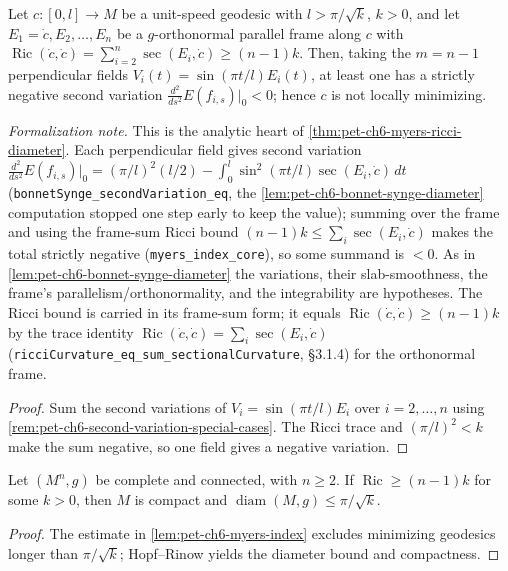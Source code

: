 \begin{lemma}
  \label{lem:pet-ch6-myers-index}


  Let $c:[0,l]\to M$ be a unit-speed geodesic with $l>\pi/\sqrt k$, $k>0$, and let
  $E_1=\dot c,E_2,\dots,E_n$ be a $g$-orthonormal parallel frame along $c$ with
  $\operatorname{Ric}(\dot c,\dot c)=\sum_{i=2}^n\sec(E_i,\dot c)\ge(n-1)k$. Then, taking the
  $m=n-1$ perpendicular fields $V_i(t)=\sin(\pi t/l)E_i(t)$, at least one has a strictly
  negative second variation $\tfrac{d^2}{ds^2}E(f_{i,s})|_0<0$; hence $c$ is not locally
  minimizing.

  \emph{Formalization note.} This is the analytic heart of \cref{thm:pet-ch6-myers-ricci-diameter}.
  Each perpendicular field gives second variation
  $\tfrac{d^2}{ds^2}E(f_{i,s})|_0=(\pi/l)^2(l/2)-\int_0^l\sin^2(\pi t/l)\sec(E_i,\dot c)\,dt$
  (\texttt{bonnetSynge\_secondVariation\_eq}, the \cref{lem:pet-ch6-bonnet-synge-diameter}
  computation stopped one step early to keep the value); summing over the frame and using the
  frame-sum Ricci bound $(n-1)k\le\sum_i\sec(E_i,\dot c)$ makes the total strictly negative
  (\texttt{myers\_index\_core}), so some summand is $<0$. As in
  \cref{lem:pet-ch6-bonnet-synge-diameter} the variations, their slab-smoothness, the frame's
  parallelism/orthonormality, and the integrability are hypotheses. The Ricci bound is carried in
  its frame-sum form; it equals $\operatorname{Ric}(\dot c,\dot c)\ge(n-1)k$ by the trace identity
  $\operatorname{Ric}(\dot c,\dot c)=\sum_i\sec(E_i,\dot c)$
  (\texttt{ricciCurvature\_eq\_sum\_sectionalCurvature}, §3.1.4) for the orthonormal frame.
\end{lemma}
\begin{proof}

  \sketch
  Sum the second variations of \(V_i=\sin(\pi t/l)E_i\) over \(i=2,\ldots,n\) using \cref{rem:pet-ch6-second-variation-special-cases}. The Ricci trace and \((\pi/l)^2<k\) make the sum negative, so one field gives a negative variation.
\end{proof}

\begin{theorem}
  \label{thm:pet-ch6-myers-ricci-geometric}


  Let $(M^n,g)$ be complete and connected, with $n\ge2$. If
  $\operatorname{Ric}\ge(n-1)k$ for some $k>0$, then $M$ is compact and
  $\operatorname{diam}(M,g)\le\pi/\sqrt k$.
\end{theorem}
\begin{proof}

  \sketch
  The estimate in \cref{lem:pet-ch6-myers-index} excludes minimizing geodesics longer than \(\pi/\sqrt{k}\); Hopf--Rinow yields the diameter bound and compactness.
\end{proof}

